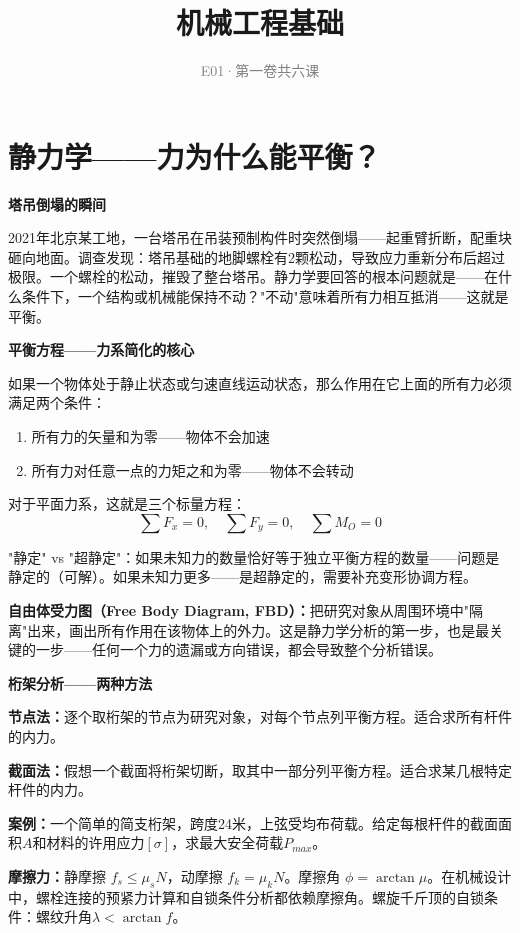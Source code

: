 \documentclass[a4paper,11pt]{ctexbook}
\title{\textcolor{themeblue}{\Huge\textbf{机械工程基础}}}
\subtitle{\textcolor{gray}{E01·第一卷\quad 共六课}}
\author{}
\date{}
\newenvironment{scenario}{
  \vspace{0.4cm}
  \noindent\begin{tcolorbox}[colback=scenario!5!white,colframe=scenario!70!black,title=\textcolor{scenario}{\textbf{情景引入}}]
  \vspace{0.1cm}
}{\end{tcolorbox}\vspace{0.3cm}}
\newenvironment{qualitative}{
  \vspace{0.3cm}
  \noindent\begin{tcolorbox}[colback=themeblue!5!white,colframe=themeblue!60!black,title=\textcolor{themeblue}{\textbf{定性分析}}]
  \vspace{0.1cm}
}{\end{tcolorbox}\vspace{0.3cm}}
\newenvironment{quantitative}{
  \vspace{0.3cm}
  \noindent\begin{tcolorbox}[colback=quant!5!white,colframe=quant!60!black,title=\textcolor{quant}{\textbf{定量分析}}]
  \vspace{0.1cm}
}{\end{tcolorbox}\vspace{0.3cm}}
\begin{document}
\maketitle
\thispagestyle{empty}
\tableofcontents
\newpage

\chapter{静力学——力为什么能平衡？}

\begin{scenario}
\textbf{塔吊倒塌的瞬间}

2021年北京某工地，一台塔吊在吊装预制构件时突然倒塌——起重臂折断，配重块砸向地面。调查发现：塔吊基础的地脚螺栓有2颗松动，导致应力重新分布后超过极限。一个螺栓的松动，摧毁了整台塔吊。静力学要回答的根本问题就是——在什么条件下，一个结构或机械能保持不动？"不动"意味着所有力相互抵消——这就是平衡。
\end{scenario}

\begin{qualitative}
\textbf{平衡方程——力系简化的核心}

如果一个物体处于静止状态或匀速直线运动状态，那么作用在它上面的所有力必须满足两个条件：

\begin{enumerate}
  \item 所有力的矢量和为零——物体不会加速
  \item 所有力对任意一点的力矩之和为零——物体不会转动
\end{enumerate}

对于平面力系，这就是三个标量方程：
\[
\sum F_x = 0, \quad \sum F_y = 0, \quad \sum M_O = 0
\]

"静定" vs "超静定"：如果未知力的数量恰好等于独立平衡方程的数量——问题是静定的（可解）。如果未知力更多——是超静定的，需要补充变形协调方程。

\textbf{自由体受力图（Free Body Diagram, FBD）：}把研究对象从周围环境中"隔离"出来，画出所有作用在该物体上的外力。这是静力学分析的第一步，也是最关键的一步——任何一个力的遗漏或方向错误，都会导致整个分析错误。
\end{qualitative}

\begin{quantitative}
\textbf{桁架分析——两种方法}

\textbf{节点法：}逐个取桁架的节点为研究对象，对每个节点列平衡方程。适合求所有杆件的内力。

\textbf{截面法：}假想一个截面将桁架切断，取其中一部分列平衡方程。适合求某几根特定杆件的内力。

\textbf{案例：}一个简单的简支桁架，跨度24米，上弦受均布荷载。给定每根杆件的截面面积$A$和材料的许用应力$[\sigma]$，求最大安全荷载$P_{max}$。

\textbf{摩擦力：}静摩擦 $f_s \le \mu_s N$，动摩擦 $f_k = \mu_k N$。摩擦角 $\phi = \arctan\mu$。在机械设计中，螺栓连接的预紧力计算和自锁条件分析都依赖摩擦角。螺旋千斤顶的自锁条件：螺纹升角$\lambda < \arctan f$。
\end{quantitative}
\end{document}
